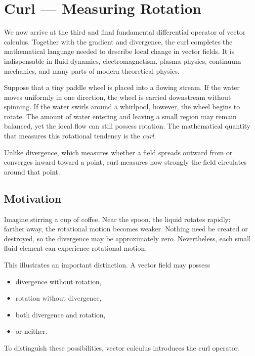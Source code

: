 \section{Curl --- Measuring Rotation}
\label{sec:curl}

We now arrive at the third and final fundamental differential operator of vector
calculus. Together with the gradient and divergence, the curl completes the
mathematical language needed to describe local change in vector fields. It is
indispensable in fluid dynamics, electromagnetism, plasma physics, continuum
mechanics, and many parts of modern theoretical physics.

Suppose that a tiny paddle wheel is placed into a flowing stream. If the water
moves uniformly in one direction, the wheel is carried downstream without
spinning. If the water swirls around a whirlpool, however, the wheel begins to
rotate. The amount of water entering and leaving a small region may remain
balanced, yet the local flow can still possess rotation. The mathematical
quantity that measures this rotational tendency is the \emph{curl}.

Unlike divergence, which measures whether a field spreads outward from or
converges inward toward a point, curl measures how strongly the field circulates
around that point.

\subsection{Motivation}

Imagine stirring a cup of coffee. Near the spoon, the liquid rotates rapidly;
farther away, the rotational motion becomes weaker. Nothing need be created or
destroyed, so the divergence may be approximately zero. Nevertheless, each
small fluid element can experience rotational motion.

This illustrates an important distinction. A vector field may possess

\begin{itemize}
  \item divergence without rotation,
  \item rotation without divergence,
  \item both divergence and rotation,
  \item or neither.
\end{itemize}

To distinguish these possibilities, vector calculus introduces the curl
operator.

